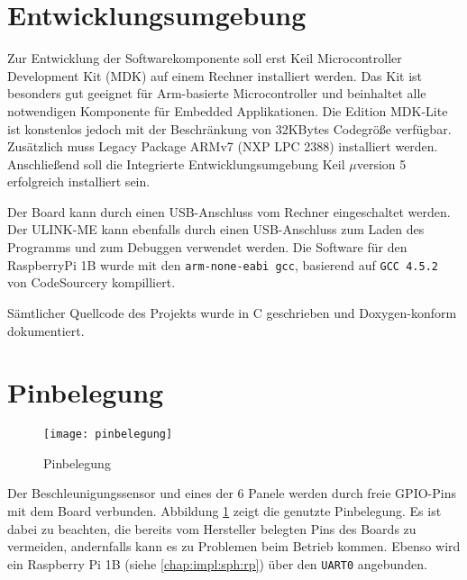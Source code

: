 \section{Entwicklungsumgebung}
Zur Entwicklung der Softwarekomponente soll erst Keil\textsuperscript{\scriptsize\textregistered} Microcontroller Development Kit (MDK) auf einem Rechner installiert werden. Das Kit ist besonders gut geeignet für Arm\textsuperscript{\scriptsize\textregistered}-basierte Microcontroller und beinhaltet alle notwendigen Komponente für Embedded Applikationen. Die Edition MDK-Lite ist konstenlos jedoch mit der Beschränkung von 32KBytes Codegröße verfügbar. Zusätzlich muss Legacy Package ARMv7 (NXP LPC 2388) installiert werden. Anschließend soll die Integrierte Entwicklungsumgebung Keil $\mu$version 5 erfolgreich installiert sein.

Der Board kann durch einen USB-Anschluss vom Rechner eingeschaltet werden. Der ULINK-ME kann ebenfalls durch einen USB-Anschluss zum Laden des Programms und zum Debuggen verwendet werden.
Die Software für den RaspberryPi 1B wurde mit den \texttt{arm-none-eabi gcc}, basierend auf \texttt{GCC 4.5.2} von CodeSourcery kompilliert.

Sämtlicher Quellcode des Projekts wurde in C geschrieben und Doxygen-konform dokumentiert.


\section{Pinbelegung}

\begin{figure}
	\centering
	\texttt{[image: pinbelegung]}
	\caption[Pinbelegung]{Pinbelegung}
	\label{fig:pins}
\end{figure}

Der Beschleunigungssensor und eines der 6 Panele werden durch freie GPIO-Pins mit dem Board verbunden. Abbildung \ref{fig:pins} zeigt die genutzte Pinbelegung. Es ist dabei zu beachten, die bereits vom Hersteller belegten Pins des Boards zu vermeiden, andernfalls kann es zu Problemen beim Betrieb kommen. Ebenso wird ein Raspberry Pi 1B (siehe \ref{chap:impl:sph:rp}) über den \texttt{UART0} angebunden.
